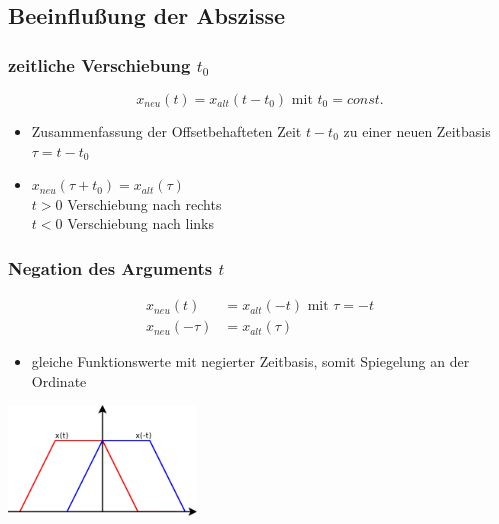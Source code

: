 \subsection*{Beeinflußung der Abszisse}
\begin{multicols}{2}
 \subsubsection*{zeitliche Verschiebung \texorpdfstring{$t_0$}{}}
  \begin{equation*}
   x_{neu}\left(t\right) = x_{alt}\left(t - t_0\right) \text{ mit } t_0 = const.
  \end{equation*}
  \begin{itemize}
   \item Zusammenfassung der Offsetbehafteten Zeit \(t - t_0\) zu einer neuen Zeitbasis \(\tau = t - t_0\)
   \item \(x_{neu}\left(\tau + t_0\right) = x_{alt}\left(\tau\right) \) \\
         \(t > 0\) Verschiebung nach rechts\\
	 	 \(t < 0\) Verschiebung nach links
  \end{itemize}
 \vspace*{10mm} 
  \begin{center}
  
  \end{center}
 \vfill
\end{multicols}

\begin{multicols}{2}
 \subsubsection*{Negation des Arguments \texorpdfstring{$t$}{}}
  \begin{align*}
   x_{neu}\left(t\right) &= x_{alt}\left(-t\right) \text{ mit } \tau = -t \\
   x_{neu}\left(-\tau\right) &= x_{alt}\left(\tau\right)
  \end{align*}
  \begin{itemize}
   \item gleiche Funktionswerte mit negierter Zeitbasis, somit Spiegelung an der Ordinate
  \end{itemize}

\vfill
  \begin{center}
  \includegraphics[width=50mm,keepaspectratio=true]{./Elektrotechnik/Bilder/argument.pdf}
  \end{center}
\end{multicols}

